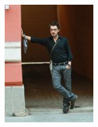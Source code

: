 \begin{figure}[h]
\begin{subfigure}[b]{.2\textwidth}
  \includegraphics[height=\textwidth]{./images/LSP3}
\end{subfigure}
\begin{subfigure}[b]{.15\textwidth}
	\centering

\end{subfigure}
\end{figure}
